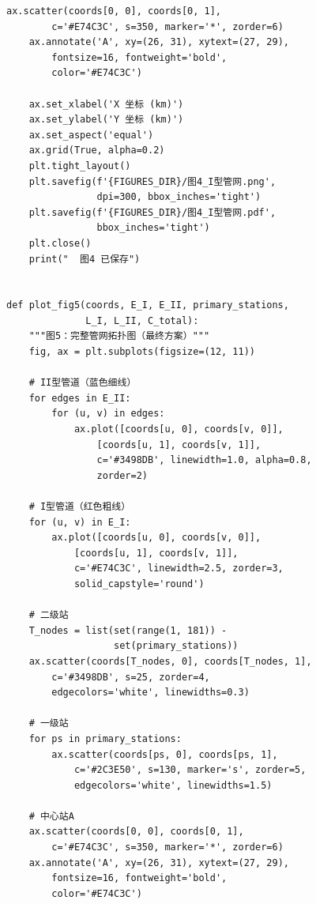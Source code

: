 \documentclass[12pt,a4paper]{ctexart}
\theoremstyle{definition}
\theoremstyle{plain}
\theoremstyle{remark}
\begin{document}
\begin{lstlisting}[caption={\texttt{visualization.py}：论文图表生成}]
    ax.scatter(coords[0, 0], coords[0, 1],
        c='#E74C3C', s=350, marker='*', zorder=6)
    ax.annotate('A', xy=(26, 31), xytext=(27, 29),
        fontsize=16, fontweight='bold',
        color='#E74C3C')

    ax.set_xlabel('X 坐标 (km)')
    ax.set_ylabel('Y 坐标 (km)')
    ax.set_aspect('equal')
    ax.grid(True, alpha=0.2)
    plt.tight_layout()
    plt.savefig(f'{FIGURES_DIR}/图4_I型管网.png',
                dpi=300, bbox_inches='tight')
    plt.savefig(f'{FIGURES_DIR}/图4_I型管网.pdf',
                bbox_inches='tight')
    plt.close()
    print("  图4 已保存")


def plot_fig5(coords, E_I, E_II, primary_stations,
              L_I, L_II, C_total):
    """图5：完整管网拓扑图（最终方案）"""
    fig, ax = plt.subplots(figsize=(12, 11))

    # II型管道（蓝色细线）
    for edges in E_II:
        for (u, v) in edges:
            ax.plot([coords[u, 0], coords[v, 0]],
                [coords[u, 1], coords[v, 1]],
                c='#3498DB', linewidth=1.0, alpha=0.8,
                zorder=2)

    # I型管道（红色粗线）
    for (u, v) in E_I:
        ax.plot([coords[u, 0], coords[v, 0]],
            [coords[u, 1], coords[v, 1]],
            c='#E74C3C', linewidth=2.5, zorder=3,
            solid_capstyle='round')

    # 二级站
    T_nodes = list(set(range(1, 181)) -
                   set(primary_stations))
    ax.scatter(coords[T_nodes, 0], coords[T_nodes, 1],
        c='#3498DB', s=25, zorder=4,
        edgecolors='white', linewidths=0.3)

    # 一级站
    for ps in primary_stations:
        ax.scatter(coords[ps, 0], coords[ps, 1],
            c='#2C3E50', s=130, marker='s', zorder=5,
            edgecolors='white', linewidths=1.5)

    # 中心站A
    ax.scatter(coords[0, 0], coords[0, 1],
        c='#E74C3C', s=350, marker='*', zorder=6)
    ax.annotate('A', xy=(26, 31), xytext=(27, 29),
        fontsize=16, fontweight='bold',
        color='#E74C3C')


\end{lstlisting}
\end{document}
